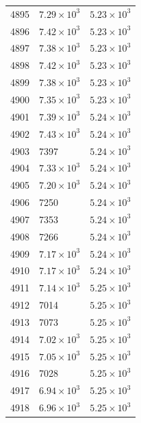 \begin{table}[H]
\begin{tabular}{lll}
4895 & $\displaystyle 7.29 \times 10^{3}$ & $\displaystyle 5.23 \times 10^{3}$ \\
4896 & $\displaystyle 7.42 \times 10^{3}$ & $\displaystyle 5.23 \times 10^{3}$ \\
4897 & $\displaystyle 7.38 \times 10^{3}$ & $\displaystyle 5.23 \times 10^{3}$ \\
4898 & $\displaystyle 7.42 \times 10^{3}$ & $\displaystyle 5.23 \times 10^{3}$ \\
4899 & $\displaystyle 7.38 \times 10^{3}$ & $\displaystyle 5.23 \times 10^{3}$ \\
4900 & $\displaystyle 7.35 \times 10^{3}$ & $\displaystyle 5.23 \times 10^{3}$ \\
4901 & $\displaystyle 7.39 \times 10^{3}$ & $\displaystyle 5.24 \times 10^{3}$ \\
4902 & $\displaystyle 7.43 \times 10^{3}$ & $\displaystyle 5.24 \times 10^{3}$ \\
4903 & 7397 & $\displaystyle 5.24 \times 10^{3}$ \\
4904 & $\displaystyle 7.33 \times 10^{3}$ & $\displaystyle 5.24 \times 10^{3}$ \\
4905 & $\displaystyle 7.20 \times 10^{3}$ & $\displaystyle 5.24 \times 10^{3}$ \\
4906 & 7250 & $\displaystyle 5.24 \times 10^{3}$ \\
4907 & 7353 & $\displaystyle 5.24 \times 10^{3}$ \\
4908 & 7266 & $\displaystyle 5.24 \times 10^{3}$ \\
4909 & $\displaystyle 7.17 \times 10^{3}$ & $\displaystyle 5.24 \times 10^{3}$ \\
4910 & $\displaystyle 7.17 \times 10^{3}$ & $\displaystyle 5.24 \times 10^{3}$ \\
4911 & $\displaystyle 7.14 \times 10^{3}$ & $\displaystyle 5.25 \times 10^{3}$ \\
4912 & 7014 & $\displaystyle 5.25 \times 10^{3}$ \\
4913 & 7073 & $\displaystyle 5.25 \times 10^{3}$ \\
4914 & $\displaystyle 7.02 \times 10^{3}$ & $\displaystyle 5.25 \times 10^{3}$ \\
4915 & $\displaystyle 7.05 \times 10^{3}$ & $\displaystyle 5.25 \times 10^{3}$ \\
4916 & 7028 & $\displaystyle 5.25 \times 10^{3}$ \\
4917 & $\displaystyle 6.94 \times 10^{3}$ & $\displaystyle 5.25 \times 10^{3}$ \\
4918 & $\displaystyle 6.96 \times 10^{3}$ & $\displaystyle 5.25 \times 10^{3}$ \\

\end{tabular}
\end{table}
